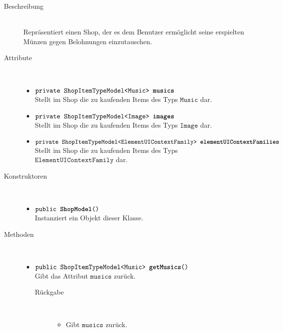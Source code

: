 \begin{description}
\item[Beschreibung] \hfill \\ Repräsentiert einen Shop, der es dem Benutzer ermöglicht seine erspielten Münzen gegen Belohnungen einzutauschen.

\item[Attribute] \hfill \\
	\vspace{-.8cm}
	\begin{itemize}
		\item $\texttt{private ShopItemTypeModel<Music> \textbf{musics}}$ \\ Stellt im Shop die zu kaufenden Items des Typs $\texttt{Music}$ dar.
		\item $\texttt{private ShopItemTypeModel<Image> \textbf{images}}$ \\ Stellt im Shop die zu kaufenden Items des Typs $\texttt{Image}$ dar.		
		\item $\texttt{private ShopItemTypeModel<ElementUIContextFamily> \textbf{elementUIContextFamilies}}$ \\ Stellt im Shop die zu kaufenden Items des Typs $\texttt{ElementUIContextFamily}$ dar.
		\end{itemize}
	
\item[Konstruktoren] \hfill \\
	\vspace{-.8cm}
	\begin{itemize}
		\item $\texttt{public \textbf{ShopModel}()}$ \\ Instanziert ein Objekt dieser Klasse.

	\end{itemize}
	
\item[Methoden] \hfill \\
	\vspace{-.8cm}
	\begin{itemize}
		\item $\texttt{public ShopItemTypeModel<Music> \textbf{getMusics}()}$ \\ Gibt das Attribut $\texttt{musics}$ zurück.
		\begin{description}
			\item[Rückgabe] \hfill \\
			\vspace{-.8cm}
			\begin{itemize}
				\item Gibt $\texttt{musics}$ zurück.
			\end{itemize}
			\end{description}
		

\end{itemize}
\end{description}
